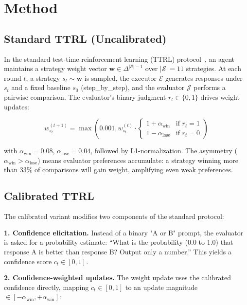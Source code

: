 \documentclass[11pt]{article}
\begin{document}
\section{Method}

\subsection{Standard TTRL (Uncalibrated)}

In the standard test-time reinforcement learning (TTRL) protocol~\cite{liu2026epc}, an agent maintains a strategy weight vector $\mathbf{w} \in \Delta^{|\mathcal{S}|-1}$ over $|\mathcal{S}|{=}11$ strategies. At each round $t$, a strategy $s_t \sim \mathbf{w}$ is sampled, the executor $\mathcal{E}$ generates responses under $s_t$ and a fixed baseline $s_0$ (step\_by\_step), and the evaluator $\mathcal{J}$ performs a pairwise comparison. The evaluator's binary judgment $r_t \in \{0,1\}$ drives weight updates:

\begin{equation}
w_{s_t}^{(t+1)} = \max\left(0.001, w_{s_t}^{(t)} \cdot \begin{cases}
1 + \alpha_{\text{win}} & \text{if } r_t = 1 \\
1 - \alpha_{\text{lose}} & \text{if } r_t = 0
\end{cases}\right)
\end{equation}

with $\alpha_{\text{win}}{=}0.08$, $\alpha_{\text{lose}}{=}0.04$, followed by L1-normalization. The asymmetry ($\alpha_{\text{win}} > \alpha_{\text{lose}}$) means evaluator preferences accumulate: a strategy winning more than 33\% of comparisons will gain weight, amplifying even weak preferences.

\subsection{Calibrated TTRL}

The calibrated variant modifies two components of the standard protocol:

\textbf{1. Confidence elicitation.} Instead of a binary "A or B" prompt, the evaluator is asked for a probability estimate: ``What is the probability (0.0 to 1.0) that response A is better than response B? Output only a number.'' This yields a confidence score $c_t \in [0,1]$.

\textbf{2. Confidence-weighted updates.} The weight update uses the calibrated confidence directly, mapping $c_t \in [0,1]$ to an update magnitude $\in [-\alpha_{\text{win}}, +\alpha_{\text{win}}]$:
\end{document}
